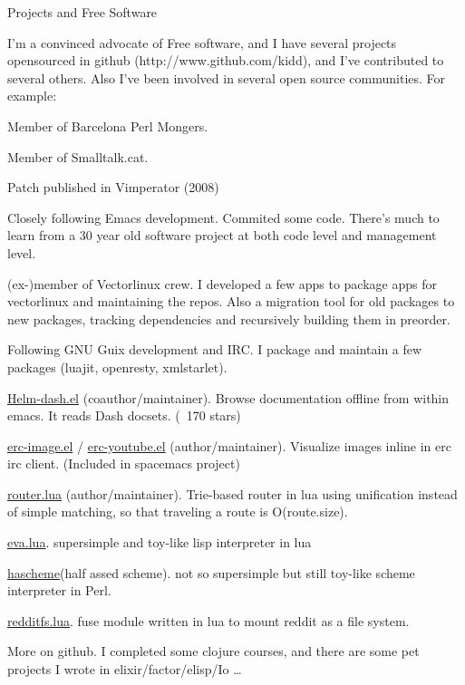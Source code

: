 \documentclass{resume} %
\begin{document}
\begin{rSection}{Projects and Free Software}

  I'm a convinced advocate of Free software, and I have several
  projects opensourced in github (http://www.github.com/kidd), and
  I've contributed to several others. Also I've been involved in
  several open source communities. For example:

\item Member of Barcelona Perl Mongers.
\item Member of Smalltalk.cat.
\item Patch published in Vimperator (2008)
\item Closely following Emacs development. Commited some code. There's
  much to learn from a 30 year old software project at both code level
  and management level.
\item (ex-)member of Vectorlinux crew. I developed a few apps to
  package apps for vectorlinux and maintaining the repos. Also a
  migration tool for old packages to new packages, tracking
  dependencies and recursively building them in preorder.
\item Following GNU Guix development and IRC.  I package and maintain
  a few packages (luajit, openresty, xmlstarlet).
\item \href{https://github.com/areina/helm-dash}{Helm-dash.el}
  (coauthor/maintainer). Browse documentation offline from within
  emacs. It reads Dash docsets. (~170 stars)
\item
  \href{https://github.com/kidd/erc-image.el}{erc-image.el} /
  \href{https://github.com/kidd/erc-youtube.el}{erc-youtube.el}
  (author/maintainer). Visualize images inline in erc irc
  client. (Included in spacemacs project)
\item \href{https://github.com/apitools/router.lua}{router.lua}
  (author/maintainer). Trie-based router in lua using unification
  instead of simple matching, so that traveling a route is
  O(route.size).
\item \href{https://github.com/kidd/eva}{eva.lua}. supersimple and
  toy-like lisp interpreter in lua
\item \href{https://github.com/kidd/hascheme}{hascheme}(half assed
  scheme). not so supersimple but still toy-like scheme interpreter in
  Perl.
\item \href{https://github.com/kidd/redditfs.lua}{redditfs.lua}. fuse
  module written in lua to mount reddit as a file system.
\item More on github. I completed some clojure courses, and there
  are some pet projects I wrote in elixir/factor/elisp/Io \ldots

\end{rSection}
\end{document}

